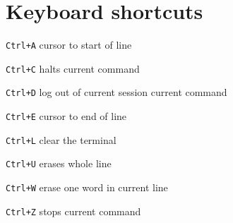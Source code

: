 \section{Keyboard shortcuts}
\begin{enumx}
	\item \texttt{Ctrl+A} cursor to start of line
	\item \texttt{Ctrl+C} halts current command
	\item \texttt{Ctrl+D} log out of current session current command
	\item \texttt{Ctrl+E} cursor to end of line
	\item \texttt{Ctrl+L} clear the terminal
	\item \texttt{Ctrl+U} erases whole line
	\item \texttt{Ctrl+W} erase one word in current line
	\item \texttt{Ctrl+Z} stops current command
\end{enumx}
